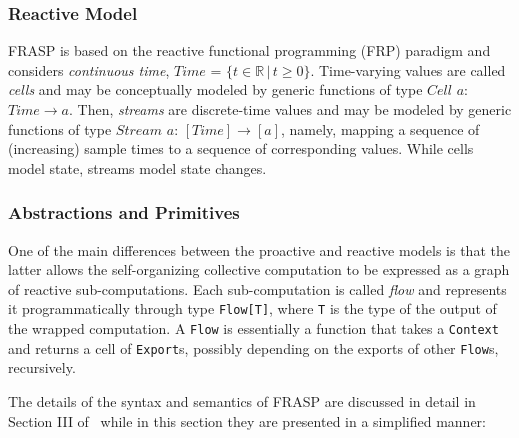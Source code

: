 \subsubsection{Reactive Model}
FRASP is based on the reactive functional programming (FRP) paradigm and considers \textit{continuous time}, $Time$ = $\{ t \in \mathbb{R} \, | \, t \geq 0 \}$. Time-varying values are called \textit{cells} and may be conceptually modeled by generic functions of type $Cell$ $a$: $Time \rightarrow a$. Then, \textit{streams} are discrete-time values and may be modeled by generic functions of type $Stream$ $a$: $[Time] \rightarrow [a]$, namely, mapping a sequence of (increasing) sample times to a sequence of corresponding values. While cells model state, streams model state changes.

\subsubsection{Abstractions and Primitives}

One of the main differences between the proactive and reactive models is that the latter allows the self-organizing collective computation to be expressed as a graph of reactive sub-computations. Each sub-computation is called \textit{flow} and represents it programmatically through type \texttt{Flow[T]}, where \texttt{T} is the type of the output of the wrapped computation. A \texttt{Flow} is essentially a function that takes a \texttt{Context} and returns a cell of \texttt{Export}s, possibly depending on the exports of other \texttt{Flow}s, recursively.

The details of the syntax and semantics of FRASP are discussed in detail in Section III of~\cite{Casadei2023} while in this section they are presented in a simplified manner:

